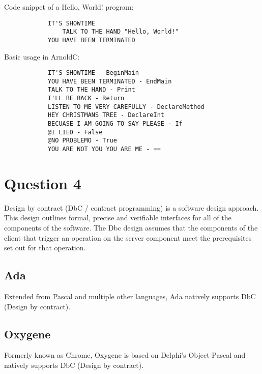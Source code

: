 \documentclass{article}
\begin{document}
    Code snippet of a Hello, World! program:
    \begin{center}
        \begin{verbatim}
            IT'S SHOWTIME
                TALK TO THE HAND "Hello, World!"
            YOU HAVE BEEN TERMINATED
        \end{verbatim} 
    \end{center}     

    Basic usage in ArnoldC:
    \begin{center}
        \begin{verbatim}
            IT'S SHOWTIME - BeginMain
            YOU HAVE BEEN TERMINATED - EndMain
            TALK TO THE HAND - Print
            I'LL BE BACK - Return
            LISTEN TO ME VERY CAREFULLY - DeclareMethod
            HEY CHRISTMANS TREE - DeclareInt
            BECUASE I AM GOING TO SAY PLEASE - If
            @I LIED - False
            @NO PROBLEMO - True
            YOU ARE NOT YOU YOU ARE ME - ==

        \end{verbatim} 
    \end{center} 

\section*{Question 4}

    Design by contract (DbC / contract programming) is a software design approach. This design outlines formal, precise
    and verifiable interfaces for all of the components of the software. The Dbc design assumes that the components of the client that trigger an operation on the server component meet the prerequisites set out
    for that operation.\cite{DesignByContract}  
    
    \subsection*{Ada}
    Extended from Pascal and multiple other languages, Ada natively supports DbC (Design by contract). \cite{Ada}

    \subsection*{Oxygene }
    Formerly known as Chrome, Oxygene is based on Delphi's Object Pascal and natively supports DbC (Design by contract). \cite{Oxygene}


\clearpage


\end{document}
